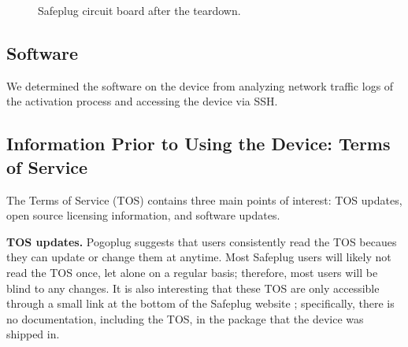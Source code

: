 \documentclass[conference]{IEEEtran}
\begin{document}
\begin{figure}[!b]
\centering
{}
\qquad
{}
\caption{Safeplug circuit board after the teardown.}
\end{figure}

\subsection{Software}
\label{software}
We determined the software on the device from analyzing network traffic logs of the activation process and accessing the device via SSH.

\subsection{Information Prior to Using the Device: Terms of Service}
\label{tos}
The Terms of Service (TOS) contains three main points of interest: TOS updates, open source licensing information, and software updates.

{\bf TOS updates.} Pogoplug suggests that users consistently read the TOS becaues they can update or change them at anytime.  Most Safeplug users will likely not read the TOS once, let alone on a regular basis; therefore, most users will be blind to any changes.  It is also interesting that these TOS are only accessible through a small link at the bottom of the Safeplug website \cite{safeplug}; specifically, there is no documentation, including the TOS, in the package that the device was shipped in.
\end{document}
